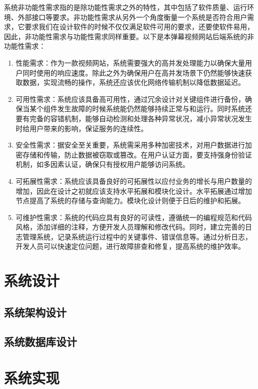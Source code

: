 系统非功能性需求指的是除功能性需求之外的特性，其中包括了软件质量、运行环境、外部接口等要求。非功能性需求从另外一个角度衡量一个系统是否符合用户需求，它要求我们在设计软件的时候不仅仅满足软件可用的要求，还要使软件易用，因此，非功能性需求与功能性需求同样重要\cite{RN08}。以下是本弹幕视频网站后端系统的非功能性需求：
\begin{enumerate}[label=(\arabic*)]
    \item 性能需求：作为一款视频网站，系统需要强大的高并发处理能力以确保大量用户同时使用的响应速度。除此之外为确保用户在高并发场景下仍然能够快速获取数据，实现流畅的操作，系统还应该优化网络传输机制以降低数据延迟。
    \item 可用性需求：系统应该具备高可用性，通过冗余设计对关键组件进行备份，确保当某个组件发生故障的时候系统能仍然能够持续正常与和运行。同时系统还要有完备的容错机制，能够自动检测和处理各种异常状况，减小异常状况发生时给用户带来的影响，保证服务的连续性。
    \item 安全性需求：据安全至关重要，系统需采用多种加密技术，对用户数据进行加密存储和传输，防止数据被窃取或篡改。在用户认证方面，要支持强身份验证机制，如多因素认证，确保只有授权用户能够访问系统。
    \item 可拓展性需求：系统应该具备良好的可拓展性以应付业务的增长与用户数量的增加，因此在设计之初就应该支持水平拓展和模块化设计。水平拓展通过增加节点提高了系统的存储与查询能力。模块化设计则便于日后的维护和拓展。
    \item 可维护性需求：系统的代码应具有良好的可读性，遵循统一的编程规范和代码风格，添加详细的注释，方便开发人员理解和修改代码。同时，建立完善的日志管理系统，记录系统运行过程中的关键事件、错误信息等。通过分析日志，开发人员可以快速定位问题，进行故障排查和修复，提高系统的维护效率。
\end{enumerate}

\newpage

\section{系统设计}
\subsection{系统架构设计}
\subsection{系统数据库设计}

\newpage

\section{系统实现}
